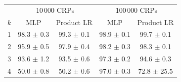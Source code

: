 \begin{tabular}{ccccc}
\toprule
 & \multicolumn{2}{c}{10\,000 CRPs} & \multicolumn{2}{c}{100\,000 CRPs} \\
$k$ & MLP & Product LR & MLP & Product LR \\
\midrule
1 & 98.3 $\pm$ 0.3 & 99.3 $\pm$ 0.1 & 98.9 $\pm$ 0.1 & 99.7 $\pm$ 0.1 \\
2 & 95.9 $\pm$ 0.5 & 97.9 $\pm$ 0.4 & 98.2 $\pm$ 0.3 & 98.3 $\pm$ 0.1 \\
3 & 93.6 $\pm$ 1.2 & 93.5 $\pm$ 0.6 & 97.3 $\pm$ 0.2 & 94.6 $\pm$ 0.3 \\
4 & 50.0 $\pm$ 0.8 & 50.2 $\pm$ 0.6 & 97.0 $\pm$ 0.3 & 72.8 $\pm$ 25.5 \\
\bottomrule
\end{tabular}
